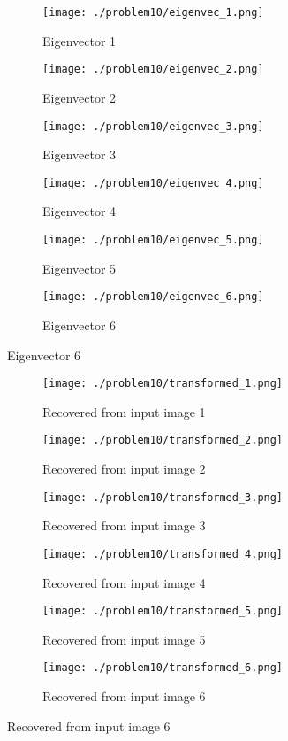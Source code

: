 \documentclass[a4paper]{scrartcl}
\begin{document}
\begin{figure}[H]
  \centering
  \caption{Eigenvectors of the input images}
  \label{fig:eigenvecs}
  \begin{subfigure}[t]{0.3\textwidth}
    \texttt{[image: ./problem10/eigenvec\_1.png]}
    \caption{Eigenvector 1}
  \end{subfigure}
  \begin{subfigure}[t]{0.3\textwidth}
    \texttt{[image: ./problem10/eigenvec\_2.png]}
    \caption{Eigenvector 2}
  \end{subfigure}
  \begin{subfigure}[t]{0.3\textwidth}
    \texttt{[image: ./problem10/eigenvec\_3.png]}
    \caption{Eigenvector 3}
  \end{subfigure}
  \begin{subfigure}[t]{0.3\textwidth}
    \texttt{[image: ./problem10/eigenvec\_4.png]}
    \caption{Eigenvector 4}
  \end{subfigure}
  \begin{subfigure}[t]{0.3\textwidth}
    \texttt{[image: ./problem10/eigenvec\_5.png]}
    \caption{Eigenvector 5}
  \end{subfigure}
  \begin{subfigure}[t]{0.3\textwidth}
    \texttt{[image: ./problem10/eigenvec\_6.png]}
    \caption{Eigenvector 6}
  \end{subfigure}
\end{figure}

\begin{figure}[H]
  \centering
  \caption{Recovered input images using two eigenvectors}
  \label{fig:eigentransformed}
  \begin{subfigure}[t]{0.3\textwidth}
    \texttt{[image: ./problem10/transformed\_1.png]}
    \caption{Recovered from input image 1}
  \end{subfigure}
  \begin{subfigure}[t]{0.3\textwidth}
    \texttt{[image: ./problem10/transformed\_2.png]}
    \caption{Recovered from input image 2}
  \end{subfigure}
  \begin{subfigure}[t]{0.3\textwidth}
    \texttt{[image: ./problem10/transformed\_3.png]}
    \caption{Recovered from input image 3}
  \end{subfigure}
  \begin{subfigure}[t]{0.3\textwidth}
    \texttt{[image: ./problem10/transformed\_4.png]}
    \caption{Recovered from input image 4}
  \end{subfigure}
  \begin{subfigure}[t]{0.3\textwidth}
    \texttt{[image: ./problem10/transformed\_5.png]}
    \caption{Recovered from input image 5}
  \end{subfigure}
  \begin{subfigure}[t]{0.3\textwidth}
    \texttt{[image: ./problem10/transformed\_6.png]}
    \caption{Recovered from input image 6}
  \end{subfigure}
\end{figure}
\end{document}

